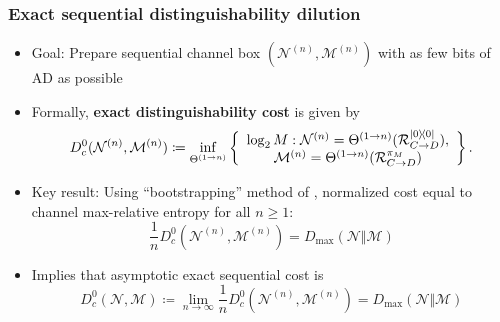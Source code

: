 \documentclass[usenames,dvipsnames,handout]{beamer}
\begin{document}
\begin{frame}
\frametitle{Exact sequential distinguishability dilution}


\begin{itemize}

\pause
\item Goal: Prepare sequential channel box $(\mathcal{N}^{(n)},\mathcal{M}^{(n)})$ with as few bits of AD as possible

\pause
\item Formally, {\color{MidnightBlue}\textbf{exact distinguishability cost}} is given by
\begin{multline*}
D_{c}^{0}(\mathcal{N}^{(n)},\mathcal{M}^{(n)})\coloneqq 
\inf_{\Theta^{(1\rightarrow n)}}\left\{
\begin{array}
[c]{c}%
\log_{2}M:\mathcal{N}^{(n)} = \Theta^{(1\rightarrow n)}(\mathcal{R}%
_{C\rightarrow D}^{|0\rangle\!\langle0|}),\\
\mathcal{M}^{(n)} =\Theta^{(1\rightarrow n)}(\mathcal{R}_{C\rightarrow D}%
^{\pi_{M}})
\end{array}
\right\}  .
\end{multline*}

\pause
\item Key result: Using ``bootstrapping'' method of \cite{GFWRSCW18}, normalized cost equal to channel max-relative entropy for all $n\geq 1$:
$$
\frac{1}{n} D_{c}^{0}(\mathcal{N}^{(n)},\mathcal{M}^{(n)}) = D_{\max}(\mathcal{N}\Vert\mathcal{M})
$$

\pause
\item Implies that asymptotic exact sequential cost is
$$
D_{c}^{0}(\mathcal{N},\mathcal{M}) \coloneqq  \lim_{n \to \infty}\frac{1}{n} D_{c}^{0}(\mathcal{N}^{(n)},\mathcal{M}^{(n)}) = D_{\max}(\mathcal{N}\Vert\mathcal{M})
$$

\end{itemize}


\end{frame}
\end{document}
